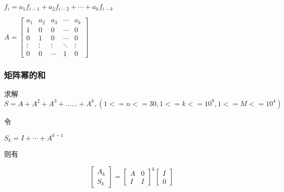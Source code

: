 $f_i = a_{1} f_{i - 1} + a_{2} f_{i - 2} + \cdots + a_{k} f_{i - k}$

$
A =
\begin{bmatrix}
    a_{1} & a_{2} & a_{3} & \cdots & a_{k} \\
    1 & 0 & 0 & \cdots & 0 \\
    0 & 1 & 0 & \cdots & 0 \\
    \vdots & \vdots & \vdots & \ddots & \vdots \\
    0 & 0 & \cdots & 1 & 0
\end{bmatrix}
$

\subsubsection{矩阵幂的和}

求解 $S = A + A^2 + A^3 + ...... + A^k, ( 1 <= n <= 30, 1 <= k <= 10^9, 1 <= M <= 10^4)$

令

$S_k = I + \cdots + A^{k - 1}$

则有

$$
\begin{bmatrix}
    A_{k} \\
    S_{k}
\end{bmatrix} =
\begin{bmatrix}
    A & 0\\
    I & I
\end{bmatrix} ^{k}
\begin{bmatrix}
    I \\
    0
\end{bmatrix}
$$

